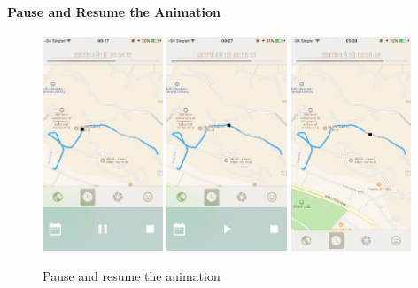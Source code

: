 \documentclass[12pt,a4paper]{article}
\begin{document}
                \paragraph{Pause and Resume the Animation}
                \begin{figure}[H]
                    \includegraphics[width=0.32\textwidth]{2-4-2-2-a}
                    \includegraphics[width=0.32\textwidth]{2-4-2-2-b}
                    \includegraphics[width=0.32\textwidth]{2-4-2-2-c}
                    \centering
                    \caption{Pause and resume the animation}
                    \label{fig:pause-resume-animation}
                \end{figure}
                
\end{document}
